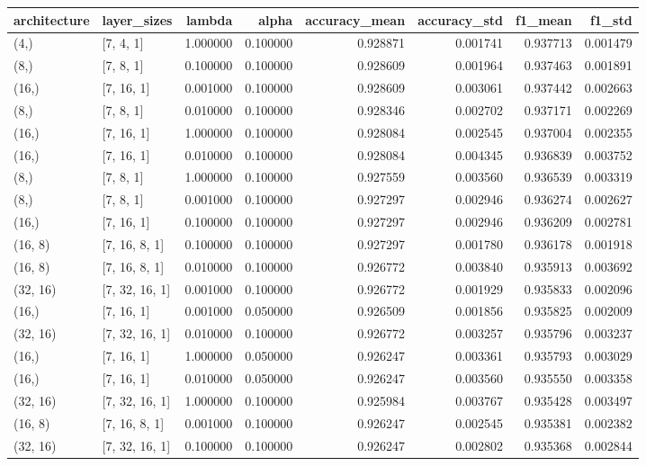 \begin{tabular}{llrrrrrr}
\toprule
architecture & layer_sizes & lambda & alpha & accuracy_mean & accuracy_std & f1_mean & f1_std \\
\midrule
(4,) & [7, 4, 1] & 1.000000 & 0.100000 & 0.928871 & 0.001741 & 0.937713 & 0.001479 \\
(8,) & [7, 8, 1] & 0.100000 & 0.100000 & 0.928609 & 0.001964 & 0.937463 & 0.001891 \\
(16,) & [7, 16, 1] & 0.001000 & 0.100000 & 0.928609 & 0.003061 & 0.937442 & 0.002663 \\
(8,) & [7, 8, 1] & 0.010000 & 0.100000 & 0.928346 & 0.002702 & 0.937171 & 0.002269 \\
(16,) & [7, 16, 1] & 1.000000 & 0.100000 & 0.928084 & 0.002545 & 0.937004 & 0.002355 \\
(16,) & [7, 16, 1] & 0.010000 & 0.100000 & 0.928084 & 0.004345 & 0.936839 & 0.003752 \\
(8,) & [7, 8, 1] & 1.000000 & 0.100000 & 0.927559 & 0.003560 & 0.936539 & 0.003319 \\
(8,) & [7, 8, 1] & 0.001000 & 0.100000 & 0.927297 & 0.002946 & 0.936274 & 0.002627 \\
(16,) & [7, 16, 1] & 0.100000 & 0.100000 & 0.927297 & 0.002946 & 0.936209 & 0.002781 \\
(16, 8) & [7, 16, 8, 1] & 0.100000 & 0.100000 & 0.927297 & 0.001780 & 0.936178 & 0.001918 \\
(16, 8) & [7, 16, 8, 1] & 0.010000 & 0.100000 & 0.926772 & 0.003840 & 0.935913 & 0.003692 \\
(32, 16) & [7, 32, 16, 1] & 0.001000 & 0.100000 & 0.926772 & 0.001929 & 0.935833 & 0.002096 \\
(16,) & [7, 16, 1] & 0.001000 & 0.050000 & 0.926509 & 0.001856 & 0.935825 & 0.002009 \\
(32, 16) & [7, 32, 16, 1] & 0.010000 & 0.100000 & 0.926772 & 0.003257 & 0.935796 & 0.003237 \\
(16,) & [7, 16, 1] & 1.000000 & 0.050000 & 0.926247 & 0.003361 & 0.935793 & 0.003029 \\
(16,) & [7, 16, 1] & 0.010000 & 0.050000 & 0.926247 & 0.003560 & 0.935550 & 0.003358 \\
(32, 16) & [7, 32, 16, 1] & 1.000000 & 0.100000 & 0.925984 & 0.003767 & 0.935428 & 0.003497 \\
(16, 8) & [7, 16, 8, 1] & 0.001000 & 0.100000 & 0.926247 & 0.002545 & 0.935381 & 0.002382 \\
(32, 16) & [7, 32, 16, 1] & 0.100000 & 0.100000 & 0.926247 & 0.002802 & 0.935368 & 0.002844 \\

\end{tabular}
